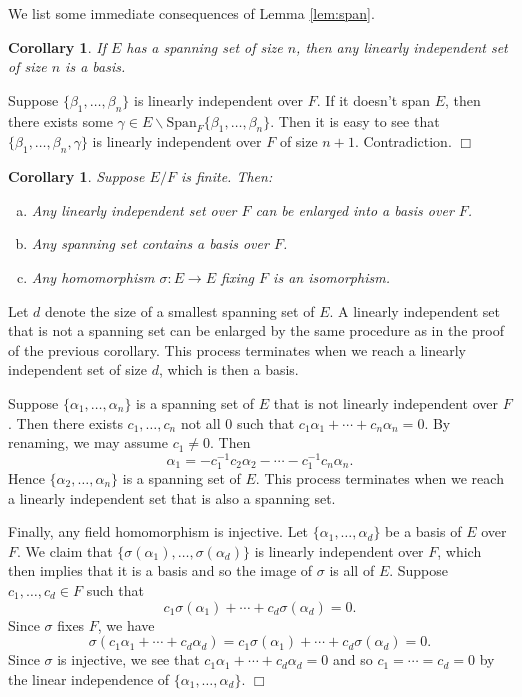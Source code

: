 \documentclass{article}
\newtheorem{cor}[subsection]{Corollary}
\newenvironment{proof}{\noindent {\bf Proof:}}{$\Box$ \vspace{2 ex}}
\begin{document}
We list some immediate consequences of Lemma \ref{lem:span}.
\begin{cor}
    If $E$ has a spanning set of size $n$, then any linearly independent set of size $n$ is a basis.
\end{cor}

\begin{proof}
    Suppose $\{\beta_1,\ldots,\beta_n\}$ is linearly independent over $F$. If it doesn't span $E$, then there exists some $\gamma\in E\backslash\text{Span}_F\{\beta_1,\ldots,\beta_n\}.$ Then it is easy to see that $\{\beta_1,\ldots,\beta_n,\gamma\}$ is linearly independent over $F$ of size $n+1$. Contradiction.
\end{proof}

\begin{cor}
    Suppose $E/F$ is finite. Then:
    \begin{enumerate}[(a)]
        \item Any linearly independent set over $F$ can be enlarged into a basis over $F$.
        \item Any spanning set contains a basis over $F$.
        \item Any homomorphism $\sigma:E\rightarrow E$ fixing $F$ is an isomorphism.
    \end{enumerate}
\end{cor}

\begin{proof}
    Let $d$ denote the size of a smallest spanning set of $E$.
    A linearly independent set that is not a spanning set can be enlarged by the same procedure as in the proof of the previous corollary. This process terminates when we reach a linearly independent set of size $d$, which is then a basis.

    Suppose $\{\alpha_1,\ldots,\alpha_n\}$ is a spanning set of $E$ that is not linearly independent over $F$. Then there exists $c_1,\ldots,c_n$ not all $0$ such that $c_1\alpha_1 + \cdots + c_n\alpha_n = 0$. By renaming, we may assume $c_1\neq 0$. Then $$\alpha_1 = -c_1^{-1}c_2\alpha_2 - \cdots - c_1^{-1}c_n\alpha_n.$$
    Hence $\{\alpha_2,\ldots,\alpha_n\}$ is a spanning set of $E$. This process terminates when we reach a linearly independent set that is also a spanning set.

    Finally, any field homomorphism is injective. Let $\{\alpha_1,\ldots,\alpha_d\}$ be a basis of $E$ over $F$. We claim that $\{\sigma(\alpha_1),\ldots,\sigma(\alpha_d)\}$ is linearly independent over $F$, which then implies that it is a basis and so the image of $\sigma$ is all of $E$. Suppose $c_1,\ldots,c_d\in F$ such that $$c_1\sigma(\alpha_1) + \cdots + c_d\sigma(\alpha_d) = 0.$$
    Since $\sigma$ fixes $F$, we have
    $$\sigma(c_1\alpha_1 + \cdots + c_d\alpha_d) = c_1\sigma(\alpha_1) + \cdots + c_d\sigma(\alpha_d) = 0.$$
    Since $\sigma$ is injective, we see that $c_1\alpha_1 + \cdots + c_d\alpha_d = 0$ and so $c_1 = \cdots = c_d = 0$ by the linear independence of $\{\alpha_1,\ldots,\alpha_d\}$.
\end{proof}
\end{document}
